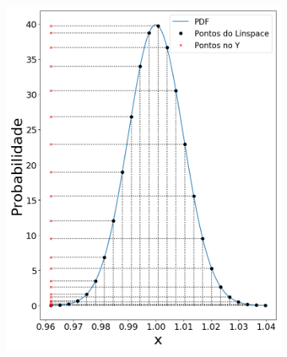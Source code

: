 \begin{figure}[H]
	\centering
	\begin{subfigure}[b]{0.3\textwidth}
		\centering 
		\includegraphics[width=\textwidth]{./figuras/lognormal_001.png}
		\caption{}
		\label{fig:lin001}
	\end{subfigure}
	\hfill
	\begin{subfigure}[b]{0.3\textwidth}
		\centering 

\end{subfigure}
\end{figure}
